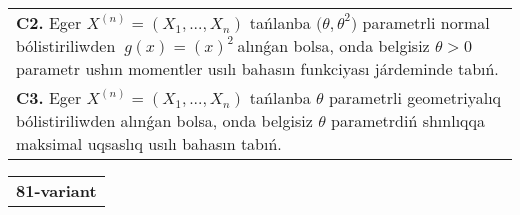 \documentclass{article}
\begin{document}
\begin{tabular}{m{17cm}}
 \\
\textbf{C2.} 
Eger \(X^{(n)} = \left( X_{1},...,X_{n} \right)\) tańlanba \({(\theta,\theta}^{2})\) parametrli normal bólistiriliwden \({\ g(x) = (x)}^{2}\ \)alınǵan bolsa, onda belgisiz \(\theta > 0\) parametr ushın momentler usılı bahasın funkciyası járdeminde tabıń.
 \\
\textbf{C3.} 
Eger \(X^{(n)} = \left( X_{1},...,X_{n} \right)\) tańlanba \(\theta\) parametrli geometriyalıq bólistiriliwden alınǵan bolsa, onda belgisiz \(\theta\) parametrdiń shınlıqqa maksimal uqsaslıq usılı bahasın tabıń.
 \\

\end{tabular}
\vspace{1cm}


\begin{tabular}{m{17cm}}
\textbf{81-variant}
\newline


\end{tabular}
\end{document}
